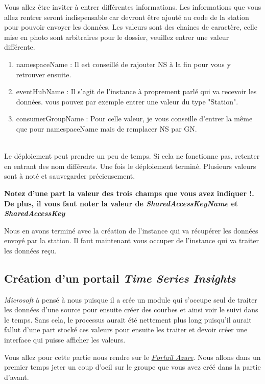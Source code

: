 \begin{enumerate}
Vous allez être inviter à entrer différentes informations. Les informations que vous allez rentrer seront indispensable car devront être ajouté au code de la station pour pouvoir envoyer les données. Les valeurs sont des chaines de caractère, celle mise en photo sont arbitraires pour le dossier, veuillez entrer une valeur différente.
	\begin{enumerate}
	\label{CLI}
		\item namespaceName : Il est conseillé de rajouter NS à la fin pour vous y retrouver ensuite. %
		\item eventHubName : Il s'agit de l'instance à proprement parlé qui va recevoir les données. vous pouvez par exemple entrer une valeur du type "Station".
		\item consumerGroupName : Pour celle valeur, je vous conseille d'entrer la même que pour namespaceName mais de remplacer NS par GN.
	\end{enumerate}\\ 
Le déploiement peut prendre un peu de temps. Si cela ne fonctionne pas, retenter en entrant des nom différents.
Une fois le déploiement terminé. Plusieurs valeurs sont à noté et sauvegarder précieusement.

\textbf{Notez d'une part la valeur des trois champs que vous avez indiquer !.
De plus, il vous faut noter la valeur de \textit{SharedAccessKeyName} et \textit{SharedAccessKey}}

\end{enumerate}

Nous en avons terminé avec la création de l'instance qui va récupérer les données envoyé par la station. Il faut maintenant vous occuper de l'instance qui va traiter les données reçu.

\subsection{Création d'un portail \textit{Time Series Insights}}

\textit{Microsoft} à pensé à nous puisque il a crée un module qui s'occupe seul de traiter les données d'une source pour ensuite créer des courbes et ainsi voir le suivi dans le temps. Sans cela, le processus aurait été nettement plus long puisqu'il aurait fallut d'une part stocké ces valeurs pour ensuite les traiter et devoir créer une interface qui puisse afficher les valeurs.

Vous allez pour cette partie nous rendre sur le \href{https://portal.azure.com}{\textit{Portail Azure}}. Nous allons dans un premier temps jeter un coup d'oeil sur le groupe que vous avez créé dans la partie d'avant. %
\\

